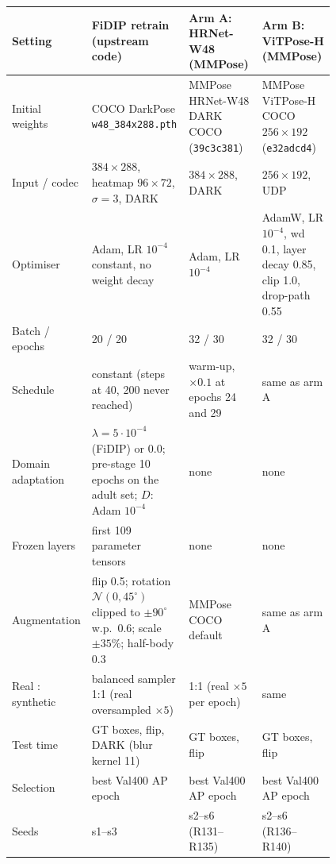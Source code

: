 \begin{tabular}{@{}lp{0.31\linewidth}p{0.25\linewidth}p{0.25\linewidth}@{}}
\toprule
Setting & FiDIP retrain (upstream code) & Arm A: HRNet-W48 (MMPose) & Arm B: ViTPose-H (MMPose)\\
\midrule
Initial weights & COCO DarkPose \texttt{w48\_384x288.pth} & MMPose HRNet-W48 DARK COCO (\texttt{39c3c381}) & MMPose ViTPose-H COCO $256{\times}192$ (\texttt{e32adcd4})\\
Input / codec & $384{\times}288$, heatmap $96{\times}72$, $\sigma=3$, DARK & $384{\times}288$, DARK & $256{\times}192$, UDP\\
Optimiser & Adam, LR $10^{-4}$ constant, no weight decay & Adam, LR $10^{-4}$ & AdamW, LR $10^{-4}$, wd 0.1, layer decay 0.85, clip 1.0, drop-path 0.55\\
Batch / epochs & 20 / 20 & 32 / 30 & 32 / 30\\
Schedule & constant (steps at 40, 200 never reached) & warm-up, $\times0.1$ at epochs 24 and 29 & same as arm A\\
Domain adaptation & $\lambda=5{\cdot}10^{-4}$ (FiDIP) or 0.0; pre-stage 10 epochs on the adult set; $D$: Adam $10^{-4}$ & none & none\\
Frozen layers & first 109 parameter tensors & none & none\\
Augmentation & flip 0.5; rotation $\mathcal{N}(0,45^\circ)$ clipped to $\pm90^\circ$ w.p.\ 0.6; scale $\pm35\%$; half-body 0.3 & MMPose COCO default & same as arm A\\
Real : synthetic & balanced sampler 1:1 (real oversampled $\times5$) & 1:1 (real $\times5$ per epoch) & same\\
Test time & GT boxes, flip, DARK (blur kernel 11) & GT boxes, flip & GT boxes, flip\\
Selection & best Val400 AP epoch & best Val400 AP epoch & best Val400 AP epoch\\
Seeds & s1--s3 & s2--s6 (R131--R135) & s2--s6 (R136--R140)\\
\bottomrule
\end{tabular}
